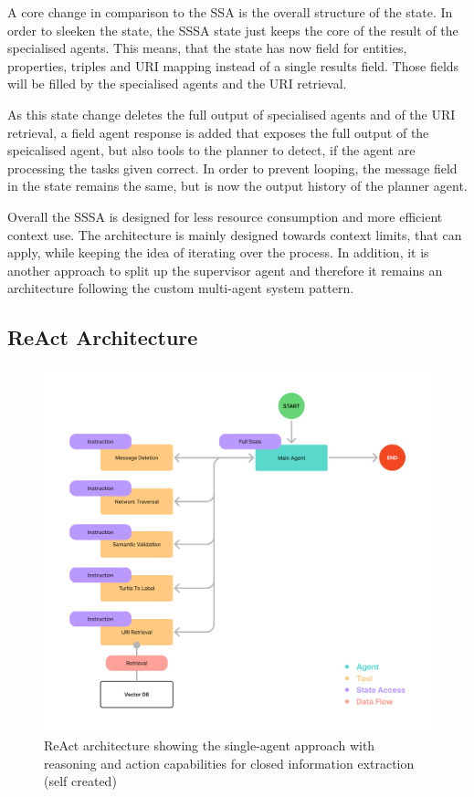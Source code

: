 \documentclass[a4paper,oneside,bibliography=totoc]{scrbook}
\begin{document}
A core change in comparison to the \ac{SSA} is the overall structure of the state. In order to sleeken the state, the \ac{SSSA} state just keeps the core of the result of the specialised agents. This means, that the state has now field for entities, properties, triples and URI mapping instead of a single results field. Those fields will be filled by the specialised agents and the URI retrieval.

As this state change deletes the full output of specialised agents and of the URI retrieval, a field agent response is added that exposes the full output of the speicalised agent, but also tools to the planner to detect, if the agent are processing the tasks given correct. In order to prevent looping, the message field in the state remains the same, but is now the output history of the planner agent.

Overall the \ac{SSSA} is designed for less resource consumption and more efficient context use. The architecture is mainly designed towards context limits, that can apply, while keeping the idea of iterating over the process. In addition, it is another approach to split up the supervisor agent and therefore it remains an architecture following the custom multi-agent system pattern.


\subsection{ReAct Architecture}
\label{subsec:react}

\begin{figure}[h]
  \centering
  \includegraphics[width=\textwidth]{figures/ReAct Architecture.png}
  \caption{ReAct architecture showing the single-agent approach with reasoning and action capabilities for closed information extraction (self created)}
  \label{fig:react_architecture}
\end{figure}
\end{document}
